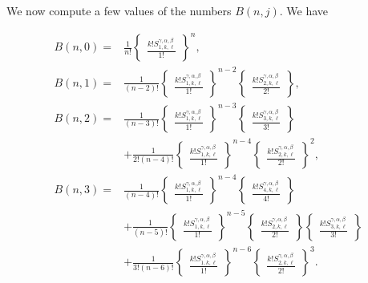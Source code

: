 \documentclass[12pt, reqno]{amsart}
\newtheorem{proof 1}{proof 1}
\begin{document}
We now compute a few values of the numbers $B(n,j)$. We have

\begin{align*}
	B(n,0)=&\frac{1}{n!}\begin{Bmatrix}\frac{k!S^{\gamma,\alpha,\beta}_{1,k,\ell}}{1!}\end{Bmatrix}^{n},\\
	B(n,1)=&\frac{1}{(n-2)!}\begin{Bmatrix}\frac{k!S^{\gamma,\alpha,\beta}_{1,k,\ell}}{1!}\end{Bmatrix}^{n-2}\begin{Bmatrix}\frac{k!S^{\gamma,\alpha,\beta}_{2,k,\ell}}{2!}\end{Bmatrix},\\
	B(n,2)=&\frac{1}{(n-3)!}\begin{Bmatrix}\frac{k!S^{\gamma,\alpha,\beta}_{1,k,\ell}}{1!}\end{Bmatrix}^{n-3}\begin{Bmatrix}\frac{k!S^{\gamma,\alpha,\beta}_{3,k,\ell}}{3!}\end{Bmatrix}\\&+\frac{1}{2!(n-4)!}\begin{Bmatrix}\frac{k!S^{\gamma,\alpha,\beta}_{1,k,\ell}}{1!}\end{Bmatrix}^{n-4}\begin{Bmatrix}\frac{k!S^{\gamma,\alpha,\beta}_{2,k,\ell}}{2!}\end{Bmatrix}^2,\\
	B(n,3)=&\frac{1}{(n-4)!}\begin{Bmatrix}
		\frac{k!S^{\gamma,\alpha,\beta}_{1,k,\ell}}{1!}
	\end{Bmatrix}^{n-4}\begin{Bmatrix}
	\frac{k!S^{\gamma,\alpha,\beta}_{4,k,\ell}}{4!}
	\end{Bmatrix}\\&+\frac{1}{(n-5)!}\begin{Bmatrix}
	\frac{k!S^{\gamma,\alpha,\beta}_{1,k,\ell}}{1!}
	\end{Bmatrix}^{n-5}\begin{Bmatrix}
		\frac{k!S^{\gamma,\alpha,\beta}_{2,k,\ell}}{2!}
	\end{Bmatrix}\begin{Bmatrix}
	\frac{k!S^{\gamma,\alpha,\beta}_{3,k,\ell}}{3!}
	\end{Bmatrix}\\&+\frac{1}{3!(n-6)!}\begin{Bmatrix}
	\frac{k!S^{\gamma,\alpha,\beta}_{1,k,\ell}}{1!}
	\end{Bmatrix}^{n-6}\begin{Bmatrix}
	\frac{k!S^{\gamma,\alpha,\beta}_{2,k,\ell}}{2!}
	\end{Bmatrix}^3.
\end{align*}
\end{document}
